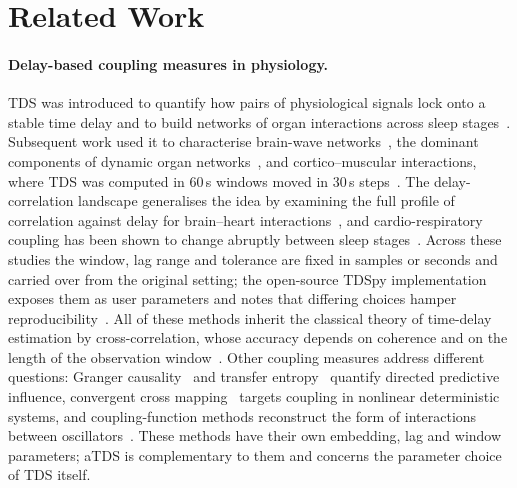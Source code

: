 \documentclass[11pt,a4paper]{article}
\begin{document}
\section{Related Work}
\label{sec:related_work}
\paragraph{Delay-based coupling measures in physiology.}
TDS was introduced to quantify how pairs of physiological signals lock onto a stable time delay and to build networks of organ interactions across sleep stages~\cite{Bashan2012NetworkPhysiology,Bartsch2015NetworkPhysiology}. Subsequent work used it to characterise brain-wave networks~\cite{Liu2015PlasticityBrain}, the dominant components of dynamic organ networks~\cite{Liu2015MajorComponent}, and cortico--muscular interactions, where TDS was computed in 60\,s windows moved in 30\,s steps~\cite{Rizzo2020NetworkPhysiology,Rizzo2022DynamicNetworks}. The delay-correlation landscape generalises the idea by examining the full profile of correlation against delay for brain--heart interactions~\cite{Lin2016DelaycorrelationLandscape}, and cardio-respiratory coupling has been shown to change abruptly between sleep stages~\cite{Bartsch2012PhaseTransitions}. Across these studies the window, lag range and tolerance are fixed in samples or seconds and carried over from the original setting; the open-source TDSpy implementation exposes them as user parameters and notes that differing choices hamper reproducibility~\cite{Steinbrinker2024TdspyOpensource}. All of these methods inherit the classical theory of time-delay estimation by cross-correlation, whose accuracy depends on coherence and on the length of the observation window~\cite{Knapp1976GeneralizedCorrelation,Carter1987CoherenceTime}. Other coupling measures address different questions: Granger causality~\cite{Granger1969InvestigatingCausal} and transfer entropy~\cite{Schreiber2000MeasuringInformation} quantify directed predictive influence, convergent cross mapping~\cite{Sugihara2012DetectingCausality} targets coupling in nonlinear deterministic systems, and coupling-function methods reconstruct the form of interactions between oscillators~\cite{Stankovski2017CouplingFunctions}. These methods have their own embedding, lag and window parameters; aTDS is complementary to them and concerns the parameter choice of TDS itself.
\end{document}
